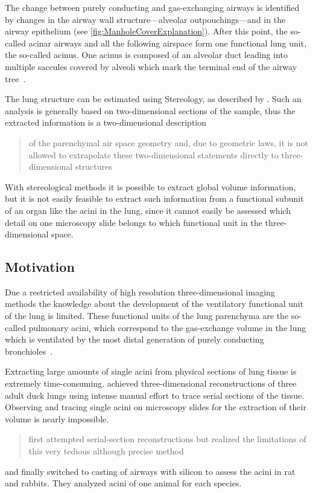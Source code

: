 \documentclass[a4paper,DIVcalc,abstract,english]{scrartcl}
\begin{document}
The change between purely conducting and gas-exchanging airways is identified by changes in the airway wall structure---alveolar outpouchings---and in the airway epithelium (see \autoref{fig:ManholeCoverExplanation}).
After this point, the so-called acinar airways and all the following airspace form one functional lung unit, the so-called acinus. One acinus is composed of an alveolar duct leading into multiple saccules covered by alveoli which mark the terminal end of the airway tree~\cite{Schittny2007a}.

The lung structure can be estimated using Stereology, as described by \citet{Hsia2010}.
Such an analysis is generally based on two-dimensional sections of the sample, thus the extracted information is a two-dimensional description \blockquote[\citet{Tschanz2002}]{of the parenchymal air space geometry and, due to geometric laws, it is not allowed to extrapolate these two-dimensional statements directly to three-dimensional structures}.
With stereological methods it is possible to extract global volume information, but it is not easily feasible to extract such information from a functional subunit of an organ like the acini in the lung, since it cannot easily be assessed which detail on one microscopy slide belongs to which functional unit in the three-dimensional space.

\subsection{Motivation}
Due a restricted availability of high resolution three-dimensional imaging methods the knowledge about the development of the ventilatory functional unit of the lung is limited.
These functional units of the lung parenchyma are the so-called pulmonary acini, which correspond to the gas-exchange volume in the lung which is ventilated by the most distal generation of purely conducting bronchioles~\cite{Rodriguez1987}.

Extracting large amounts of single acini from physical sections of lung tissue is extremely time-consuming.
\citet{Woodward2005} achieved three-dimensional reconstructions of three adult duck lungs using intense manual effort to trace serial sections of the tissue.
Observing and tracing single acini on microscopy slides for the extraction of their volume is nearly impossible.
\citet{Rodriguez1987} \blockquote{first attempted serial-section reconstructions but realized the limitations of this very tedious although precise method} and finally switched to casting of airways with silicon to assess the acini in rat and rabbits. They analyzed acini of one animal for each species.
\end{document}

